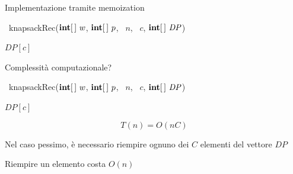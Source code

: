 \begin{frame}{Implementazione tramite memoization}

\vspace{-9pt}
\begin{Procedure}
\caption[A]{\INTEGER\ \textsf{knapsackRec}($\INTEGER[\,]\ w$, $\INTEGER[\,]\ p$, \INTEGER\ $n$, \INTEGER\ $c$, $\INTEGER[\,]\ \mathit{DP}$)}
\Return $\mathit{DP}[c]$\;
\end{Procedure}
\end{frame}

\begin{frame}{Complessità computazionale?}

\vspace{-6pt}

\begin{overprint}
\begin{Procedure}
\caption[A]{\INTEGER\ \textsf{knapsackRec}($\INTEGER[\,]\ w$, $\INTEGER[\,]\ p$, \INTEGER\ $n$, \INTEGER\ $c$, $\INTEGER[\,]\ \mathit{DP}$)}
\Return $\mathit{DP}[c]$\;
\end{Procedure}

\bigskip
\[ 
  T(n) = O(nC)
\]

\BIL
\item Nel caso pessimo, è necessario riempire ognuno dei $C$ elementi del vettore $\mathit{DP}$
\item Riempire un elemento costa $O(n)$
\EIL

\end{overprint}

\end{frame}


